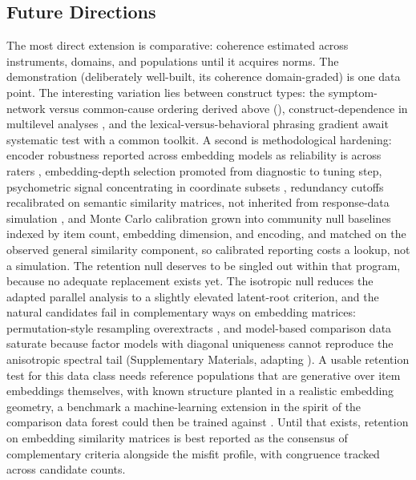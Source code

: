 \subsection{Future Directions}

The most direct extension is comparative: coherence estimated across
instruments, domains, and populations until it acquires norms. The
demonstration (deliberately well-built, its coherence
domain-graded) is one data point. The interesting variation lies between
construct types: the symptom-network versus common-cause ordering
derived above (\citealp{borsboom-2008}), construct-dependence in
multilevel analyses \citep{zhang-qiu-2026}, and the lexical-versus-behavioral
phrasing gradient \citep{milano-etal-2025b} await systematic test with a
common toolkit. A second is methodological hardening: encoder
robustness reported across embedding models as reliability is across
raters \citep{mandera-etal-2017}, embedding-depth selection promoted from
diagnostic to tuning step, psychometric signal concentrating in coordinate
subsets \citep{golino-2026}, redundancy cutoffs recalibrated on semantic
similarity matrices, not inherited from response-data simulation
\citep{christensen-etal-2023}, and Monte Carlo calibration grown into
community null baselines indexed by item count, embedding dimension, and
encoding, and matched on the observed general similarity component, so
calibrated reporting \citep{pokropek-2026} costs a lookup,
not a simulation. The retention null deserves to be singled out within
that program, because no adequate replacement exists yet. The isotropic
null reduces the adapted parallel analysis to a slightly elevated
latent-root criterion, and the natural candidates fail in complementary
ways on embedding matrices: permutation-style resampling overextracts
\citep{garrido-etal-2025}, and model-based comparison data saturate
because factor models with diagonal uniqueness cannot reproduce the
anisotropic spectral tail (Supplementary Materials, adapting
\citealp{ruscio-roche-2012}). A usable retention test for this data
class needs reference populations that are generative over item
embeddings themselves, with known structure planted in a realistic
embedding geometry, a benchmark a machine-learning extension in the
spirit of the comparison data forest could then be trained against
\citep{goretzko-ruscio-2024}. Until that exists, retention on embedding
similarity matrices is best reported as the consensus of complementary
criteria alongside the misfit profile, with congruence tracked across
candidate counts.

